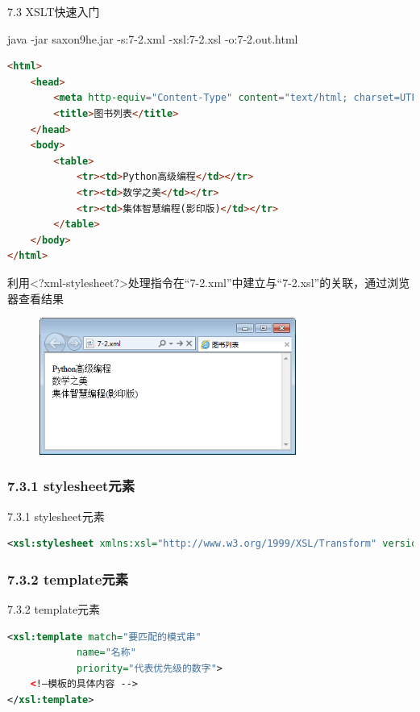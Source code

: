 \begin{frame}{7.3 XSLT快速入门}
\begin{shaded}
java -jar saxon9he.jar -s:7-2.xml -xsl:7-2.xsl -o:7-2.out.html
\end{shaded}


\begin{lstlisting}[tabsize=8, basicstyle=\small\tt, language=HTML, caption="7-2.out.html"]
<html>
    <head>
        <meta http-equiv="Content-Type" content="text/html; charset=UTF-8">
        <title>图书列表</title>
    </head>
    <body>
        <table>
            <tr><td>Python高级编程</td></tr>
            <tr><td>数学之美</td></tr>
            <tr><td>集体智慧编程(影印版)</td></tr>
        </table>
    </body>
</html>
\end{lstlisting}

\begin{shaded}
利用<?xml-stylesheet?>处理指令在“7-2.xml”中建立与“7-2.xsl”的关联，通过浏览器查看结果
\end{shaded}

\begin{figure}
    \includegraphics[width=0.75\textwidth]{figure/xslt-7-2.out.png}
\end{figure}
\end{frame}


\subsubsection{7.3.1 stylesheet元素}
\begin{frame}[fragile]{7.3.1 stylesheet元素}
\begin{lstlisting}[tabsize=8, basicstyle=\small\tt, language=XML, numbers=none]
<xsl:stylesheet xmlns:xsl="http://www.w3.org/1999/XSL/Transform" version="2.0">
\end{lstlisting}
\end{frame}


\subsubsection{7.3.2 template元素}
\begin{frame}[fragile]{7.3.2 template元素}
\begin{lstlisting}[tabsize=8, basicstyle=\small\tt, language=XML, numbers=none]
<xsl:template match="要匹配的模式串"
            name="名称"
            priority="代表优先级的数字">
    <!—模板的具体内容 -->
</xsl:template>
\end{lstlisting}
\end{frame}


